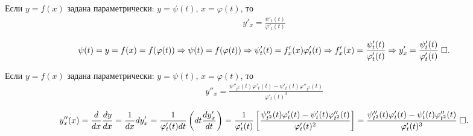 \documentclass{article}
\begin{document}

\theorem

Если $y=f(x)$ задана параметрически: $y=\psi(t)$, $x=\varphi(t)$, то
\begin{align*}
	y'_{x}=\frac{\psi'_{t}(t)}{\varphi'_{t}(t)}
\end{align*}

\proof
\begin{align*}
	\psi(t)=y=f(x)=f(\varphi(t))\Rarr \psi(t)=f(\varphi(t))\Rarr\psi'_{t}(t)=f'_{x}(x)\varphi'_{t}(t)
	\Rarr f'_{x}(x)=\frac{\psi'_{t}(t)}{\varphi'_{t}(t)}\Rarr y'_{x}=\frac{\psi'_{t}(t)}{\varphi'_{t}(t)}\qed
\end{align*}

\theorem

Если $y=f(x)$ задана параметрически: $y=\psi(t)$, $x=\varphi(t)$, то
\begin{align*}
	y''_{x}=\frac{\psi''_{t^{2}}(t)\varphi'_{t}(t)-\psi'_{t}(t)\varphi''_{t^{2}}(t)}{\varphi'_{t}(t)^{3}}
\end{align*}

\proof
\begin{align*}
	y''_{x}(x)=\frac{d}{dx}\frac{dy}{dx}=\frac{1}{dx}dy'_{x}=\frac{1}{\varphi'_{t}(t)dt}\left(dt\frac{dy'_{x}}{dt}\right)
	=\frac{1}{\varphi'_{t}(t)}\left[\frac{\psi''_{t^{2}}(t)\varphi'_{t}(t)-\psi'_{t}(t)\varphi''_{t^{2}}(t)}{\varphi'_{t}(t)^{2}}\right]
	=\frac{\psi''_{t^{2}}(t)\varphi'_{t}(t)-\psi'_{t}(t)\varphi''_{t^{2}}(t)}{\varphi'_{t}(t)^{3}}\qed
\end{align*}
\end{document}
